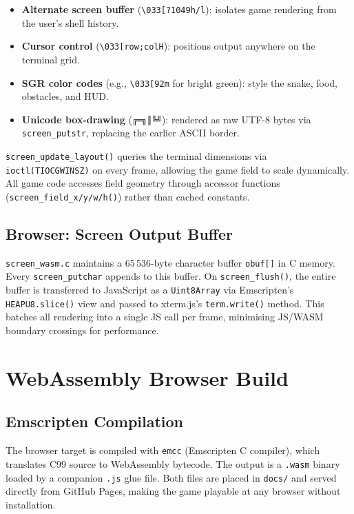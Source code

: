 \documentclass[conference]{IEEEtran}
\begin{document}
\begin{itemize}
  \item \textbf{Alternate screen buffer} (\texttt{\textbackslash{}033[?1049h/l}):
        isolates game rendering from the user's shell history.
  \item \textbf{Cursor control} (\texttt{\textbackslash{}033[row;colH}):
        positions output anywhere on the terminal grid.
  \item \textbf{SGR color codes} (e.g., \texttt{\textbackslash{}033[92m} for
        bright green): style the snake, food, obstacles, and HUD.
  \item \textbf{Unicode box-drawing} (\texttt{╔═╗║╚╝}): rendered as raw UTF-8
        bytes via \texttt{screen\_putstr}, replacing the earlier ASCII border.
\end{itemize}

\texttt{screen\_update\_layout()} queries the terminal dimensions via
\texttt{ioctl(TIOCGWINSZ)} on every frame, allowing the game field to scale
dynamically. All game code accesses field geometry through accessor functions
(\texttt{screen\_field\_x/y/w/h()}) rather than cached constants.

\subsection{Browser: Screen Output Buffer}

\texttt{screen\_wasm.c} maintains a 65\,536-byte character buffer
\texttt{obuf[]} in C memory. Every \texttt{screen\_putchar} appends to this
buffer. On \texttt{screen\_flush()}, the entire buffer is transferred to
JavaScript as a \texttt{Uint8Array} via Emscripten's \texttt{HEAPU8.slice()}
view and passed to xterm.js's \texttt{term.write()} method. This batches all
rendering into a single JS call per frame, minimising JS/WASM boundary
crossings for performance.

\section{WebAssembly Browser Build}
\label{sec:wasm}

\subsection{Emscripten Compilation}

The browser target is compiled with \texttt{emcc} (Emscripten C compiler),
which translates C99 source to WebAssembly bytecode. The output is a
\texttt{.wasm} binary loaded by a companion \texttt{.js} glue file. Both
files are placed in \texttt{docs/} and served directly from GitHub Pages,
making the game playable at any browser without installation.
\end{document}
